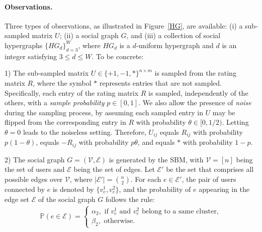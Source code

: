 \documentclass{article}
\begin{document}
\paragraph{Observations.} Three types of observations, as illustrated in  Figure~\ref{HG}, are available: (i) a sub-sampled matrix $U$; (ii) a social graph $G$, and (iii) a collection of social hypergraphs $\{HG_d \}_{d=3}^{W}$, where $HG_d$ is a $d$-uniform hypergraph and $d$ is an integer satisfying $3 \le d \le W$. To be concrete:

1) The sub-sampled matrix $U\in \{+1,-1,*\}^{n \times m}$ is sampled from the rating matrix $R$, where the symbol $*$ represents entries that are not sampled. Specifically, each entry of the rating matrix $R$ is sampled, independently of the others, with a \emph{sample probability} $p \in [0,1]$. We also allow the presence of \emph{noise} during the sampling process, by assuming each sampled entry in $U$ may be flipped from the corresponding entry in $R$  with probability $\theta \in [0,1/2)$. 
Letting $\theta = 0$ leads to the noiseless setting. Therefore, $U_{ij}$ equals $R_{ij}$ with probability $p(1-\theta)$, equals $-R_{ij}$ with probability $p\theta$, and equals $*$ with probability $1-p$. 

2) The social graph $ G = (\mathcal{V}, \mathcal{E})$ is generated by the SBM, with $\mathcal{V} = [n]$ being the set of users and $\mathcal{E}$ being the set of edges. Let $\mathcal{E}'$ be the set that comprises all possible edges over $\mathcal{V}$, where $|\mathcal{E}'| = \binom{n}{2}$. For each $e \in \mathcal{E}'$, the pair of users connected by $e$ is denoted by $ \{ v_{e}^1, v_{e}^2 \} $, and the probability of $e$ appearing in the edge set $\mathcal{E}$ of the social graph $G$ follows the rule:
\begin{align*}
   \mathbb{P}(e \in \mathcal{E}) = \begin{cases}
   \alpha_2, \text{ \ \ \ if \ } v_{e}^1 \text{\ and  } v_{e}^2 \text{ belong to a same cluster},\\  
   \beta_2, \text{ \  \ \ otherwise}.
   \end{cases}
\end{align*}
\end{document}
